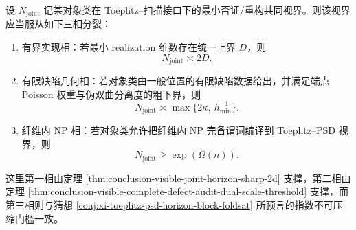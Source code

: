 \begin{conjecture}\label{conj:conclusion-visible-toeplitz-audit-three-phase-law}
设 \(N_{\mathrm{joint}}\) 记某对象类在 Toeplitz--扫描接口下的最小否证/重构共同视界。则该视界应当服从如下三相分裂：
\begin{enumerate}
  \item \textnormal{有界实现相：}若最小 realization 维数存在统一上界 \(D\)，则
  \[
  N_{\mathrm{joint}}\asymp 2D.
  \]
  \item \textnormal{有限缺陷几何相：}若对象类由一般位置的有限缺陷数据给出，并满足端点 Poisson 权重与伪双曲分离度的粗下界，则
  \[
  N_{\mathrm{joint}}\asymp \max\{2\kappa,\ h_{\min}^{-1}\}.
  \]
  \item \textnormal{纤维内 NP 相：}若对象类允许把纤维内 NP 完备谓词编译到 Toeplitz--PSD 视界，则
  \[
  N_{\mathrm{joint}}\ge \exp(\Omega(n)).
  \]
\end{enumerate}
这里第一相由定理 \ref{thm:conclusion-visible-joint-horizon-sharp-2d} 支撑，第二相由定理 \ref{thm:conclusion-visible-complete-defect-audit-dual-scale-threshold} 支撑，而第三相则与猜想 \ref{conj:xi-toeplitz-psd-horizon-block-foldsat} 所预言的指数不可压缩门槛一致。
\end{conjecture}

